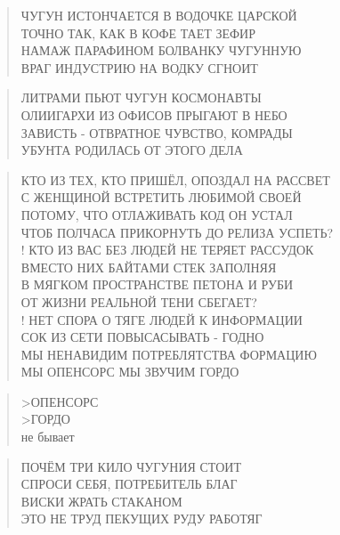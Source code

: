 \poemtitle{***}
\begin{verse}
ЧУГУН ИСТОНЧАЕТСЯ В ВОДОЧКЕ ЦАРСКОЙ\\
ТОЧНО ТАК, КАК В КОФЕ ТАЕТ ЗЕФИР\\
НАМАЖ ПАРАФИНОМ БОЛВАНКУ ЧУГУННУЮ\\
ВРАГ ИНДУСТРИЮ НА ВОДКУ СГНОИТ
\end{verse}

\poemtitle{***}
\begin{verse}
ЛИТРАМИ ПЬЮТ ЧУГУН КОСМОНАВТЫ\\
ОЛИИГАРХИ ИЗ ОФИСОВ ПРЫГАЮТ В  НЕБО\\
ЗАВИСТЬ - ОТВРАТНОЕ ЧУВСТВО, КОМРАДЫ\\
УБУНТА РОДИЛАСЬ ОТ ЭТОГО ДЕЛА
\end{verse}

\poemtitle{***}
\begin{verse}
КТО ИЗ ТЕХ, КТО ПРИШЁЛ, ОПОЗДАЛ НА РАССВЕТ\\
С ЖЕНЩИНОЙ ВСТРЕТИТЬ ЛЮБИМОЙ СВОЕЙ\\
ПОТОМУ, ЧТО ОТЛАЖИВАТЬ КОД ОН УСТАЛ\\
ЧТОБ ПОЛЧАСА ПРИКОРНУТЬ ДО РЕЛИЗА УСПЕТЬ?\\!
КТО ИЗ ВАС БЕЗ ЛЮДЕЙ НЕ ТЕРЯЕТ РАССУДОК\\
ВМЕСТО НИХ БАЙТАМИ СТЕК ЗАПОЛНЯЯ\\
В МЯГКОМ ПРОСТРАНСТВЕ ПЕТОНА И РУБИ\\
ОТ ЖИЗНИ РЕАЛЬНОЙ ТЕНИ СБЕГАЕТ?\\!
НЕТ СПОРА О ТЯГЕ ЛЮДЕЙ К ИНФОРМАЦИИ\\
СОК ИЗ СЕТИ ПОВЫСАСЫВАТЬ - ГОДНО\\
МЫ НЕНАВИДИМ ПОТРЕБЛЯТСТВА ФОРМАЦИЮ\\
МЫ ОПЕНСОРС МЫ ЗВУЧИМ ГОРДО
\end{verse}

\poemtitle{***}
\begin{verse}
>ОПЕНСОРС\\
>ГОРДО\\
не бывает
\end{verse}

\poemtitle{***}
\begin{verse}
ПОЧЁМ ТРИ КИЛО ЧУГУНИЯ СТОИТ\\
    СПРОСИ СЕБЯ, ПОТРЕБИТЕЛЬ БЛАГ\\
ВИСКИ ЖРАТЬ СТАКАНОМ\\
    ЭТО НЕ ТРУД ПЕКУЩИХ РУДУ РАБОТЯГ
\end{verse}

